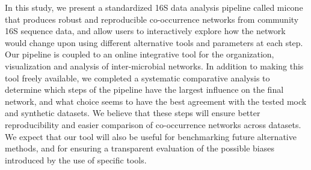  In this study, we present a standardized 16S data analysis pipeline called \ac{micone} that produces robust and reproducible co-occurrence networks from community 16S sequence data, and allow users to interactively explore how the network would change upon using different alternative tools and parameters at each step.
  Our pipeline is coupled to an online integrative tool for the organization, visualization and analysis of inter-microbial networks.
  In addition to making this tool freely available, we completed a systematic comparative analysis to determine which steps of the pipeline have the largest influence on the final network, and what choice seems to have the best agreement with the tested mock and synthetic datasets.
  We believe that these steps will ensure better reproducibility and easier comparison of co-occurrence networks across datasets.
  We expect that our tool will also be useful for benchmarking future alternative methods, and for ensuring a transparent evaluation of the possible biases introduced by the use of specific tools.
